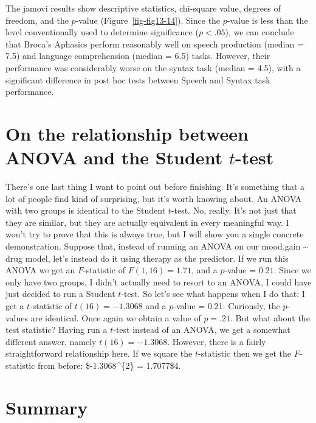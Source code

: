 \documentclass[
  a4paper,
]{book}
\begin{document}
The jamovi results show descriptive statistics, chi-square value,
degrees of freedom, and the \(p\)-value (Figure~\ref{fig-fig13-14}).
Since the \(p\)-value is less than the level conventionally used to
determine significance (\(p < .05\)), we can conclude that Broca's
Aphasics perform reasonably well on speech production (median = 7.5) and
language comprehension (median = 6.5) tasks. However, their performance
was considerably worse on the syntax task (median = 4.5), with a
significant difference in post hoc tests between Speech and Syntax task
performance.

\hypertarget{sec-On-the-relationship-between-ANOVA-and-the-Student-t-test}{%
\section{\texorpdfstring{On the relationship between ANOVA and the
Student
\(t\)-test}{On the relationship between ANOVA and the Student t-test}}\label{sec-On-the-relationship-between-ANOVA-and-the-Student-t-test}}

There's one last thing I want to point out before finishing. It's
something that a lot of people find kind of surprising, but it's worth
knowing about. An ANOVA with two groups is identical to the Student
\(t\)-test. No, really. It's not just that they are similar, but they
are actually equivalent in every meaningful way. I won't try to prove
that this is always true, but I will show you a single concrete
demonstration. Suppose that, instead of running an ANOVA on our
mood.gain \textasciitilde{} drug model, let's instead do it using
therapy as the predictor. If we run this ANOVA we get an \(F\)-statistic
of \(F(1,16) = 1.71\), and a \(p\)-value = \(0.21\). Since we only have
two groups, I didn't actually need to resort to an ANOVA, I could have
just decided to run a Student \(t\)-test. So let's see what happens when
I do that: I get a \(t\)-statistic of \(t(16) = -1.3068\) and a
\(p\)-value = 0.21. Curiously, the \(p\)-values are identical. Once
again we obtain a value of \(p = .21\). But what about the test
statistic? Having run a \(t\)-test instead of an ANOVA, we get a
somewhat different answer, namely \(t(16) = -1.3068\). However, there is
a fairly straightforward relationship here. If we square the
\(t\)-statistic then we get the \(F\)-statistic from before:
\$-1.3068\^{}\{2\} = 1.7077\$4.

\hypertarget{summary}{%
\section{Summary}\label{summary}}
\end{document}

